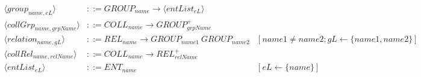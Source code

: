 \begin{landscape}
\begin{adjustbox}{max width=\linewidth,max height=.95\textheight,valign=c}
{\begin{align}
                \langle group_{name, eL} \rangle            & ::= GROUP_{name} \to \langle entList_{eL} \rangle                                                                                                                                                                                                                                                                                                                     \label{meta:group}                                                                                                                                                 \\
                \langle collGrp_{name,grpName} \rangle      & ::= COLL_{name} \to GROUP_{grpName}^+                                                                                                                                                                                                                                                                                                                                 \label{meta:collGroup}                                                                                                                                             \\[1em]
                \langle relation_{name, gL} \rangle         & ::= REL_{name} \to GROUP_{name1} ~ GROUP_{name2}                                                                                                                                                                                                                                                                                                                                             & [name1 \neq name2; gL \gets \{name1, name2\}]                                                                     \label{meta:rel}        \\
                \langle collRel_{name,relName} \rangle      & ::= COLL_{name} \to REL_{relName}^+                                                                                                                                                                                                                                                                                                                                   \label{meta:collRel}                                                                                                                                               \\[1em]
                \langle entList_{eL} \rangle                & ::= ENT_{name}                                                                                                                                                                                                                                                                                                                                                                               & [eL \gets \{name\}]                                                                                               \label{meta:entList:1}  \\

\end{align}}
\end{adjustbox}
\end{landscape}
